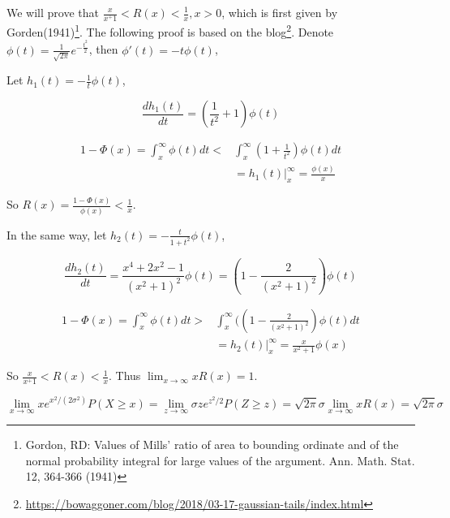 \documentclass{article}
\begin{document}
We will prove that $\frac{x}{x^+1} <  R(x) < \frac{1}{x}, x>0$, which is first given by Gorden(1941)\footnote{Gordon, RD: Values of Mills’ ratio of area to bounding ordinate and of the normal probability integral for large values of the argument. Ann. Math. Stat. 12, 364-366 (1941)}. The following proof is based on the blog\footnote{\url{https://bowaggoner.com/blog/2018/03-17-gaussian-tails/index.html}}. Denote $\phi(t) = \frac{1}{\sqrt{2\pi}} e^{-\frac{t^2}{2}}$, then $\phi'(t) = -t \phi(t)$, 

Let $h_1(t) = -\frac{1}{t} \phi(t)$,

\begin{equation}
    \frac{d h_1(t)}{dt} = (\frac{1}{t^2}+1) \phi(t) 
\end{equation}

\begin{equation}
    \begin{aligned}
        1-\Phi(x) = \int_{x}^{\infty} \phi(t) dt < &\int_{x}^{\infty} (1+\frac{1}{t^2})\phi(t) dt \\
        & = h_1(t)\big|_{x}^{\infty} = \frac{\phi(x)}{x}
    \end{aligned}
\end{equation}

So $R(x) = \frac{1-\Phi(x)}{\phi(x)} < \frac{1}{x}$.

In the same way, let $h_2(t) = -\frac{t}{1+t^2} \phi(t)$,

\begin{equation}
    \frac{d h_2(t)}{dt} = \frac{x^4+2x^2-1}{(x^2+1)^2} \phi(t)  = (1-\frac{2}{(x^2+1)^2}) \phi(t)
\end{equation}

\begin{equation}
    \begin{aligned}
        1-\Phi(x) = \int_{x}^{\infty} \phi(t) dt > & \int_{x}^{\infty} ( (1-\frac{2}{(x^2+1)^2}) \phi(t)dt \\
        & = h_2(t)\big|_{x}^{\infty} = \frac{x}{x^2+1}\phi(x)
    \end{aligned}
\end{equation}

So $\frac{x}{x^+1}<R(x) < \frac{1}{x}$. Thus $\lim_{x\to \infty} xR(x) = 1$.

\begin{equation}
    \lim_{x\to\infty} xe^{x^2/(2\sigma^2)} P(X\geqslant x) = \lim_{z\to\infty} \sigma z e^{z^2/2} P(Z\geqslant z) = \sqrt{2\pi} \sigma \lim_{x\to \infty} xR(x) = \sqrt{2\pi} \sigma
\end{equation}
\end{document}
